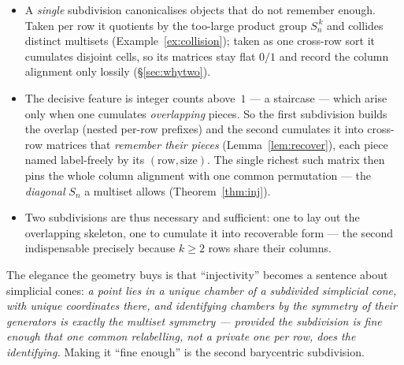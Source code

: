 \documentclass[11pt,a4paper]{article}
\theoremstyle{definition}
\theoremstyle{plain}
\newcommand{\Sn}{S_n}
\begin{document}
\begin{itemize}[leftmargin=*]
\item A \emph{single} subdivision canonicalises objects that do not remember
      enough. Taken per row it quotients by the too-large product group
      $\Sn^{\,k}$ and collides distinct multisets (Example~\ref{ex:collision});
      taken as one cross-row sort it cumulates disjoint cells, so its matrices
      stay flat $0/1$ and record the column alignment only lossily
      (\S\ref{sec:whytwo}).
\item The decisive feature is integer counts above~$1$ --- a staircase --- which
      arise only when one cumulates \emph{overlapping} pieces. So the first
      subdivision builds the overlap (nested per-row prefixes) and the second
      cumulates it into cross-row matrices that \emph{remember their pieces}
      (Lemma~\ref{lem:recover}), each piece named label-freely by its
      $(\text{row},\text{size})$. The single richest such matrix then pins the
      whole column alignment with one common permutation --- the \emph{diagonal}
      $\Sn$ a multiset allows (Theorem~\ref{thm:inj}).
\item Two subdivisions are thus necessary and sufficient: one to lay out the
      overlapping skeleton, one to cumulate it into recoverable form --- the
      second indispensable precisely because $k\ge2$ rows share their columns.
\end{itemize}

\noindent
The elegance the geometry buys is that ``injectivity'' becomes a sentence about
simplicial cones: \emph{a point lies in a unique chamber of a subdivided
simplicial cone, with unique coordinates there, and identifying chambers by the
symmetry of their generators is exactly the multiset symmetry --- provided the
subdivision is fine enough that one common relabelling, not a private one per
row, does the identifying.} Making it ``fine enough'' is the second barycentric
subdivision.
\end{document}
